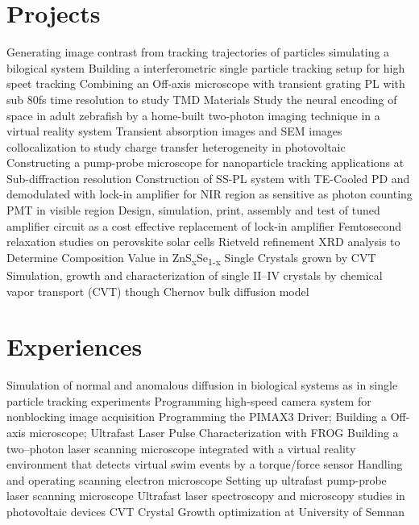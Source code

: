 \documentclass[11pt,a4paper]{moderncv}
\begin{document}
\section{Projects}
        {Generating image contrast from tracking trajectories of particles 
        simulating a bilogical system}
        {Building a interferometric single particle tracking setup 
        for high speet tracking}
        {Combining an Off-axis microscope with 
        transient grating PL with sub 80fs time resolution 
        to study TMD Materials}
        {Study the neural encoding of space in adult zebrafish 
        by a home-built two-photon 
        imaging technique in a virtual reality system}
        {Transient absorption images and SEM images collocalization 
        to study charge transfer heterogeneity in photovoltaic}
        {Constructing a pump-probe microscope for nanoparticle tracking 
        applications at Sub-diffraction resolution}
        {Construction of SS-PL system with TE-Cooled PD 
        and demodulated with lock-in amplifier for NIR region as 
        sensitive as photon counting PMT in visible region}
        {Design, simulation, print, assembly and test 
        of tuned amplifier circuit as a cost effective replacement 
        of lock-in amplifier}
        {Femtosecond relaxation studies on perovskite solar cells}
        {Rietveld refinement XRD analysis to 
        Determine Composition Value in ZnS\textsubscript{x}Se\textsubscript{1-x} 
        Single Crystals grown by CVT}
        {Simulation, growth and characterization 
        of single II--IV crystals 
        by chemical vapor transport (CVT) though Chernov bulk diffusion model}
\section{Experiences}
        {Simulation of normal and anomalous diffusion in biological systems 
        as in single particle tracking experiments}
        {Programming high-speed camera system for nonblocking 
        image acquisition}
        {Programming the PIMAX3 Driver; Building a Off-axis microscope; 
        Ultrafast Laser Pulse Characterization with FROG}
        {Building a two--photon laser scanning microscope 
        integrated with a virtual reality environment 
        that detects virtual swim events by a torque/force sensor}
        {Handling and operating scanning electron microscope}
        {Setting up ultrafast pump-probe laser scanning microscope}
        {Ultrafast laser spectroscopy and microscopy
    studies in photovoltaic devices}
        {CVT Crystal Growth optimization at University of Semnan}
\end{document}
